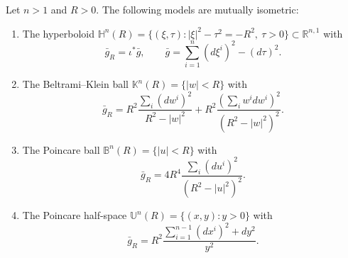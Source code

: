 \begin{theorem}
\label{thm:hyperbolic-space-models}
Let $n>1$ and $R>0$. The following models are mutually isometric:
\begin{enumerate}
\item[(a)] The hyperboloid $\mathbb H^n(R)=\{(\xi,\tau):|\xi|^2-\tau^2=-R^2,\ \tau>0\}\subset\mathbb R^{n,1}$ with
\begin{equation}
\bar g_R=\iota^*\bar g,\qquad \bar g=\sum_{i=1}^n(d\xi^i)^2-(d\tau)^2.\tag{3.8}
\end{equation}
\item[(b)] The Beltrami--Klein ball $\mathbb K^n(R)=\{|w|<R\}$ with
\begin{equation}
\bar g_R=R^2\frac{\sum_i(dw^i)^2}{R^2-|w|^2}+R^2\frac{(\sum_iw^idw^i)^2}{(R^2-|w|^2)^2}.\tag{3.9}
\end{equation}
\item[(c)] The Poincare ball $\mathbb B^n(R)=\{|u|<R\}$ with
\[
\bar g_R=4R^4\frac{\sum_i(du^i)^2}{(R^2-|u|^2)^2}.
\]
\item[(d)] The Poincare half-space $\mathbb U^n(R)=\{(x,y):y>0\}$ with
\[
\bar g_R=R^2\frac{\sum_{i=1}^{n-1}(dx^i)^2+dy^2}{y^2}.
\]
\end{enumerate}
\end{theorem}
